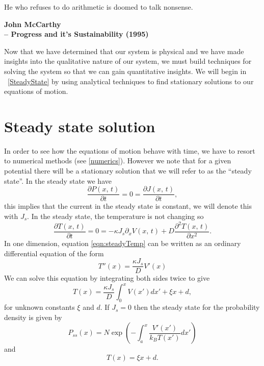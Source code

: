 \epigraph{He who refuses to do arithmetic is doomed to talk nonsense.}{\textbf{John McCarthy \\ -- Progress and it's Sustainability (1995)}}
Now that we have determined that our system is physical and we have made insights into the qualitative nature of our system, we must build techniques for solving the system so that we can gain quantitative insights. We will begin in ~\autoref{SteadyState} by using analytical techniques to find stationary solutions to our equations of motion.
\section{Steady state solution} \label{SteadyState}
In order to see how the equations of motion behave with time, we have to resort to numerical methods (see \autoref{numerics}). However we note that for a given potential there will be a stationary solution that we will refer to as the ``steady state''. In the steady state we have
\begin{equation}
\frac{\partial P(x, \, t)}{\partial t} = 0 = \frac{\partial J(x, \, t)}{\partial t},
\end{equation}
this implies that the current in the steady state is constant, we will denote this with $J_s$. In the steady state, the temperature is not changing so
\begin{equation}
\frac{\partial T(x, \, t)}{\partial t} = 0 = -\kappa J_s \partial_x V(x, \, t) + D \frac{\partial^2 T(x, \, t)}{\partial x^2}. \label{eqn:steadyTemp}
\end{equation}
In one dimension, equation \ref{eqn:steadyTemp} can be written as an ordinary differential equation of the form
\begin{equation}
T''(x) = \frac{\kappa J_s}{D} V'(x)
\end{equation}
We can solve this equation by integrating both sides twice to give
\begin{equation}
T(x) = \frac{\kappa J_s}{D} \int_0^x V(x') dx' + \xi x + d, \label{eqn:steadyTemperature}
\end{equation}
for unknown constants $\xi$ and $d$. If $J_s = 0$ then the steady state for the probability density is given by
\begin{equation}
P_{ss}(x) = N \exp{\left(-\int_a^x \frac{V'(x')}{k_B T(x')} dx' \right)}
\end{equation}
and
\begin{equation}
T(x) = \xi x + d.
\end{equation}
